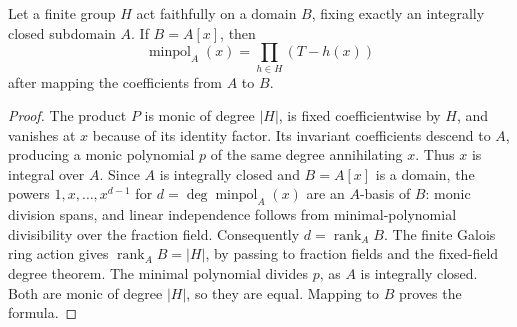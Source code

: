 \begin{lemma}
\label{fw:galois-generator-conjugates}
\leanok
Let a finite group $H$ act faithfully on a domain $B$, fixing exactly
an integrally closed subdomain $A$. If $B=A[x]$, then
\[
 \operatorname{minpol}_A(x)=\prod_{h\in H}(T-h(x))
\]
after mapping the coefficients from $A$ to $B$.
\end{lemma}
\begin{proof}
The product $P$ is monic of degree $|H|$, is fixed coefficientwise by
$H$, and vanishes at $x$ because of its identity factor. Its invariant
coefficients descend to $A$, producing a monic polynomial $p$ of the
same degree annihilating $x$. Thus $x$ is integral over $A$.
Since $A$ is integrally closed and $B=A[x]$ is a domain, the powers
$1,x,\ldots,x^{d-1}$ for $d=\deg\operatorname{minpol}_A(x)$ are an
$A$-basis of $B$: monic division spans, and linear independence follows
from minimal-polynomial divisibility over the fraction field.
Consequently $d=\operatorname{rank}_A B$.
The finite Galois ring action gives
$\operatorname{rank}_A B=|H|$, by passing to fraction fields and the
fixed-field degree theorem. The minimal polynomial divides $p$, as
$A$ is integrally closed. Both are monic of degree $|H|$, so they are
equal. Mapping to $B$ proves the formula.
\end{proof}

